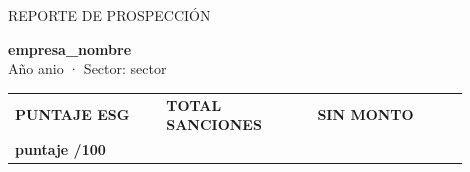 \documentclass[10pt,a4paper]{article}
\begin{document}
{\small\textcolor{gris}{REPORTE DE PROSPECCIÓN}}\par\vspace{4pt}

{\LARGE\bfseries {{ empresa_nombre }}}\\[6pt]
{\large\textcolor{azul}{A\~no {{ anio }} · Sector: {{ sector }}}}
\vspace{6pt}{\color{azul}\rule{\linewidth}{1pt}}

\vspace{4pt}\noindent{\large\bfseries\textcolor{azul}{Resumen ejecutivo}}\par\vspace{2pt}{\color{azul}\rule{\linewidth}{1pt}}\par\vspace{6pt}

{\setlength{\arrayrulewidth}{1pt}
\begin{tabular}{@{}p{0.3\linewidth}p{0.3\linewidth}p{0.3\linewidth}@{}}
\toprule
\textcolor{gris}{\footnotesize\bfseries PUNTAJE ESG} & \textcolor{gris}{\footnotesize\bfseries TOTAL SANCIONES} & \textcolor{gris}{\footnotesize\bfseries SIN MONTO} \\
{\LARGE\bfseries {{ puntaje }}/100} & {\LARGE\bfseries {%
\bottomrule\end{tabular}}
\end{document}
